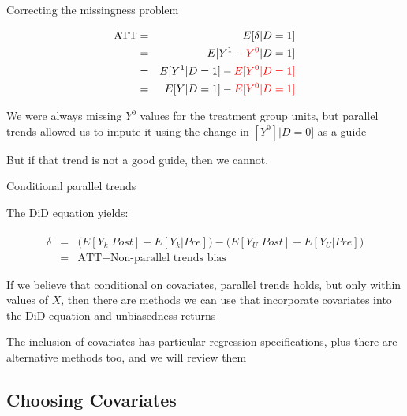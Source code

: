 \documentclass{beamer}
\begin{document}
\begin{frame}{Correcting the missingness problem}

\begin{eqnarray*}
\text{ATT} &=& E[\delta | D=1] \\
&=& E[Y^1-\textcolor{red}{Y^0} | D=1] \\
&=& E[Y^1 | D=1] - \textcolor{red}{E[Y^0|D=1]} \\
&=& E[Y | D=1] - \textcolor{red}{E[Y^0|D=1]} 
\end{eqnarray*}

\bigskip

We were always missing $Y^0$ values for the treatment group units, but parallel trends allowed us to impute it using the change in $[Y^0]|D=0]$ as a guide

\bigskip

But if that trend is not a good guide, then we cannot.  


\end{frame}


\begin{frame}{Conditional parallel trends}

The DiD equation yields:

\begin{eqnarray*}
\widehat{\delta} &=& \bigg ( E[Y_k|Post] - E[Y_k|Pre] \bigg ) - \bigg ( E[Y_U | Post ] - E[ Y_U | Pre] \bigg) \\
&=& \text{ATT} + \text{Non-parallel trends bias}
\end{eqnarray*}

\bigskip

If we believe that conditional on covariates, parallel trends holds, but only within values of $X$, then there are methods we can use that incorporate covariates into the DiD equation and unbiasedness returns

\bigskip 

The inclusion of covariates has particular regression specifications, plus there are alternative methods too, and we will review them

\end{frame}

\subsection{Choosing Covariates}
\end{document}
